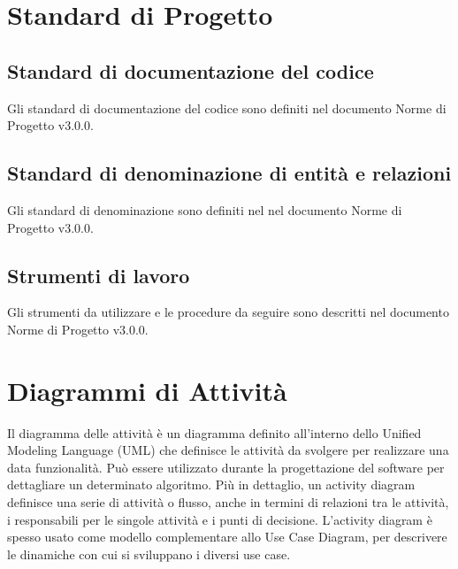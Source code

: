 


\section{Standard di Progetto}

\subsection{Standard di documentazione del codice}
Gli standard di documentazione del codice sono definiti nel
documento Norme di Progetto v3.0.0.

\subsection{Standard di denominazione di entità e relazioni }
Gli standard di denominazione sono definiti nel nel
documento Norme di Progetto v3.0.0.

\subsection{Strumenti di lavoro}
Gli strumenti da utilizzare e le procedure da seguire sono descritti
nel documento Norme di Progetto v3.0.0.


\section{Diagrammi di Attività}
Il diagramma delle attività è un diagramma definito all'interno dello
Unified Modeling Language (UML) che definisce le attività da svolgere
per realizzare una data funzionalità. Può essere utilizzato durante la
progettazione del software per dettagliare un determinato
algoritmo. Più in dettaglio, un activity diagram definisce una serie
di attività o flusso, anche in termini di relazioni tra le attività, i
responsabili per le singole attività e i punti di
decisione. L'activity diagram è spesso usato come modello
complementare allo Use Case Diagram, per descrivere le dinamiche con
cui si sviluppano i diversi use case. 

